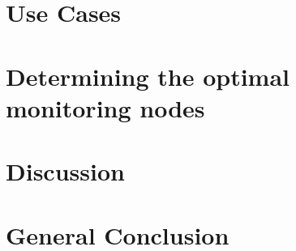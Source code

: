 \newpage
\section{Use Cases}


\section{Determining the optimal monitoring nodes}


\section{Discussion}


\section{General Conclusion}
